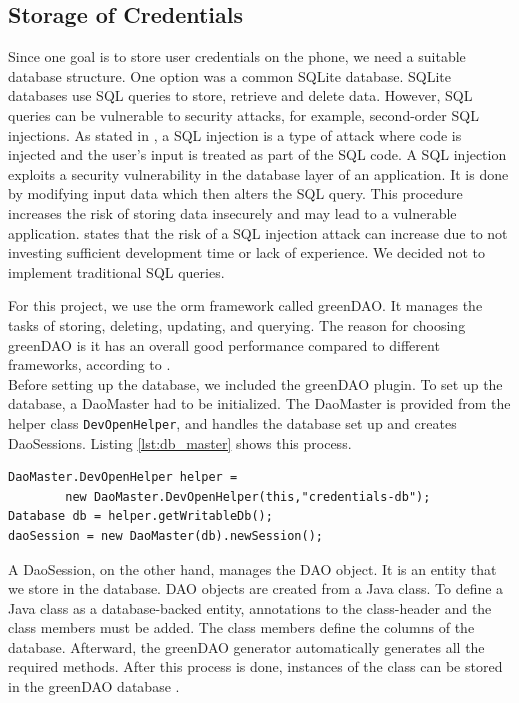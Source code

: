 

\subsection{Storage of Credentials}
Since one goal is to store user credentials on the phone, we need a suitable database structure. One option was a common SQLite database. SQLite databases use SQL queries to store, retrieve and delete data. However, SQL queries can be vulnerable to security attacks, for example, second-order SQL injections. As stated in \cite{Halfond2005}, a SQL injection is a type of attack where code is injected and the user's input is treated as part of the SQL code. A SQL injection exploits a security vulnerability in the database layer of an application. It is done by modifying input data which then alters the SQL query. This procedure increases the risk of storing data insecurely and may lead to a vulnerable application. \cite{katole2018detection} states that the risk of a SQL injection attack can increase due to not investing sufficient development time or lack of experience. We decided not to implement traditional SQL queries.

For this project, we use the \gls{orm} framework called greenDAO. It manages the tasks of storing, deleting, updating, and querying. The reason for choosing greenDAO is it has an overall good performance compared to different frameworks, according to \cite{Greendao}. \\
Before setting up the database, we included the greenDAO plugin. To set up the database, a DaoMaster had to be initialized. The DaoMaster is provided from the helper class \texttt{DevOpenHelper}, and handles the database set up and creates DaoSessions. Listing \ref{lst:db_master} shows this process.

\begin{lstlisting}[float,floatplacement=h, caption=Creation of Database, label=lst:db_master]
DaoMaster.DevOpenHelper helper = 
        new DaoMaster.DevOpenHelper(this,"credentials-db");
Database db = helper.getWritableDb();
daoSession = new DaoMaster(db).newSession();
\end{lstlisting}

A DaoSession, on the other hand, manages the DAO object. It is an entity that we store in the database. DAO objects are created from a Java class. To define a Java class as a database-backed entity, annotations to the class-header and the class members must be added. The class members define the columns of the database. Afterward, the greenDAO generator automatically generates all the required methods. After this process is done, instances of the class can be stored in the greenDAO database \cite{Greendao}.

